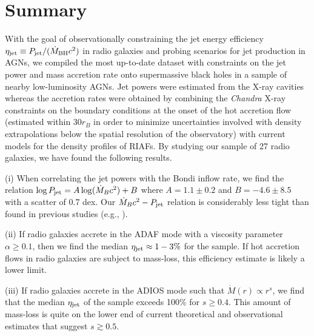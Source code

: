 \documentclass[useAMS,usenatbib]{mn2e}
\begin{document}








\section{Summary}	\label{sec:end}

With the goal of observationally constraining the jet energy efficiency $\eta_{\rm jet} \equiv P_{\rm jet}/(\dot{M}_{\rm BH} c^2)$ in radio galaxies and probing scenarios for jet production in AGNs, 
we compiled the most up-to-date dataset with constraints on the jet power and mass accretion rate onto supermassive black holes in a sample of nearby low-luminosity AGNs. Jet powers were estimated from the X-ray cavities whereas the accretion rates were obtained by combining the \emph{Chandra} X-ray constraints on the boundary conditions at the onset of the hot accretion flow (estimated within $30 r_B$ in order to minimize uncertainties involved with density extrapolations below the spatial resolution of the observatory) with current models for the density profiles of RIAFs. By studying our sample of 27 radio galaxies, we have found the following results.

(i) When correlating the jet powers with the Bondi inflow rate, we find the relation $\log P_{\rm jet} = A \log (\dot{M}_B c^2) + B$ where $A=1.1 \pm 0.2$ and $B=-4.6 \pm 8.5$ with a scatter of 0.7 dex. Our $\dot{M}_B c^2 - P_{\rm jet}$ relation is considerably less tight than found in previous studies (e.g., \citealt{Allen06}). 

(ii) If radio galaxies accrete in the ADAF mode with a viscosity parameter $\alpha \geq 0.1$, then we find the median $\eta_{\rm jet} \approx 1-3\%$ for the sample. If hot accretion flows in radio galaxies are subject to mass-loss, this efficiency estimate is likely a lower limit. 

(iii) If radio galaxies accrete in the ADIOS mode such that $\dot{M}(r) \propto r^s$, we find that the median $\eta_{\rm jet}$ of the sample exceeds 100\% for $s \geq 0.4$. This amount of mass-loss is quite on the lower end of current theoretical and observational estimates that suggest $s \gtrsim 0.5$.
\end{document}
